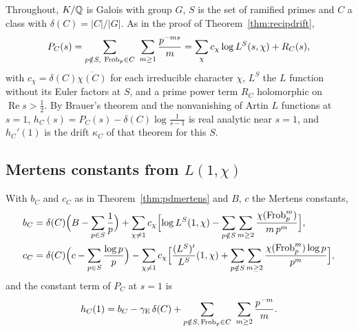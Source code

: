 Throughout, $K/\mathbb{Q}$ is Galois with group $G$, $S$ is the set of ramified primes and $C$ a class with $\delta(C)=|C|/|G|$. As in the proof of Theorem~\ref{thm:recipdrift},
\[
P_C(s)=\sum_{p\notin S,\ \Frob_p\in C}\ \sum_{m\ge1}\frac{p^{-ms}}m=\sum_\chi c_\chi\log L^S(s,\chi)+R_C(s),
\]
with $c_\chi=\delta(C)\overline{\chi(C)}$ for each irreducible character $\chi$, $L^S$ the $L$ function without its Euler factors at $S$, and a prime power term $R_C$ holomorphic on $\operatorname{Re}s>\frac12$. By Brauer's theorem and the nonvanishing of Artin $L$ functions at $s=1$, $h_C(s)=P_C(s)-\delta(C)\log\frac1{s-1}$ is real analytic near $s=1$, and $h_C'(1)$ is the drift $\kappa_C$ of that theorem for this $S$.

\subsection{Mertens constants from \texorpdfstring{$L(1,\chi)$}{L(1,chi)}}

\begin{theorem}\label{thm:pdmertensL}
With $b_C$ and $c_C$ as in Theorem~\ref{thm:pdmertens} and $B$, $c$ the Mertens constants,
\begin{align*}
b_C&=\delta(C)\Bigl(B-\sum_{p\in S}\frac1p\Bigr)+\sum_{\chi\ne1}c_\chi\Bigl[\log L^S(1,\chi)-\sum_{p\notin S}\sum_{m\ge2}\frac{\chi(\operatorname{Frob}_p^m)}{m\,p^m}\Bigr],\\
c_C&=\delta(C)\Bigl(c-\sum_{p\in S}\frac{\log p}p\Bigr)-\sum_{\chi\ne1}c_\chi\Bigl[\frac{(L^S)'}{L^S}(1,\chi)+\sum_{p\notin S}\sum_{m\ge2}\frac{\chi(\operatorname{Frob}_p^m)\log p}{p^m}\Bigr],
\end{align*}
and the constant term of $P_C$ at $s=1$ is
\[
h_C(1)=b_C-\gamma_{\mathrm E}\,\delta(C)+\sum_{p\notin S,\,\Frob_p\in C}\ \sum_{m\ge2}\frac{p^{-m}}m .
\]
\end{theorem}

